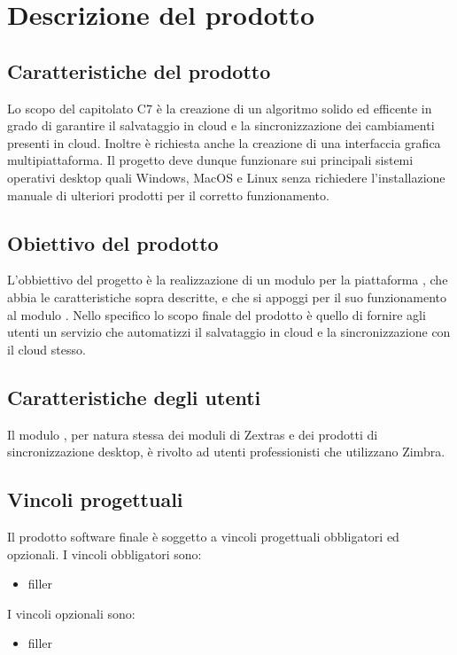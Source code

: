 \section{Descrizione del prodotto}
\subsection{Caratteristiche del prodotto}
Lo scopo del capitolato C7 è la creazione di un algoritmo solido ed efficente in grado di garantire il salvataggio in cloud e la sincronizzazione dei cambiamenti presenti in cloud. Inoltre è richiesta anche la creazione di una interfaccia grafica multipiattaforma. Il progetto deve dunque funzionare sui principali sistemi operativi desktop quali Windows, MacOS e Linux senza richiedere l'installazione manuale di ulteriori prodotti per il corretto funzionamento. 
\subsection{Obiettivo del prodotto}
L'obbiettivo del progetto è la realizzazione di un modulo per la piattaforma , che abbia le caratteristiche sopra descritte, e che si appoggi per il suo funzionamento al modulo .
Nello specifico lo scopo finale del prodotto è quello di fornire agli utenti un servizio che automatizzi il salvataggio in cloud e la sincronizzazione con il cloud stesso.
\subsection{Caratteristiche degli utenti}
Il modulo \progetto{}, per natura stessa dei moduli di Zextras e dei prodotti di sincronizzazione desktop, è rivolto ad utenti professionisti che utilizzano Zimbra. 
\subsection{Vincoli progettuali}
Il prodotto software finale è soggetto a vincoli progettuali obbligatori ed opzionali.
I vincoli obbligatori sono:
\begin{itemize}
\item filler
\end{itemize}
I vincoli opzionali sono:
\begin{itemize}
\item filler
\end{itemize}
